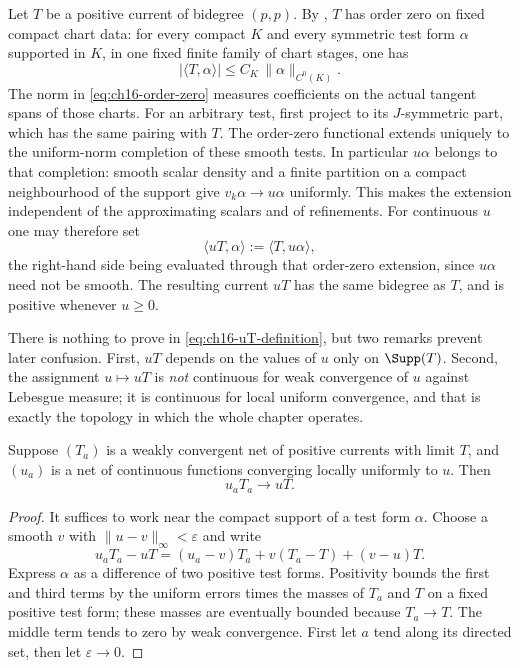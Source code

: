 Let $T$ be a positive current of bidegree $(p,p)$.  By
, $T$ has order zero on fixed compact
chart data: for every compact $K$ and every symmetric test form $\alpha$
supported in $K$, in one fixed finite family of chart stages, one has
\begin{equation}
\label{eq:ch16-order-zero}
 |\langle T,\alpha\rangle|
 \leq C_K\,\|\alpha\|_{C^0(K)} .
\end{equation}
The norm in \eqref{eq:ch16-order-zero} measures coefficients on the
actual tangent spans of those charts.  For an arbitrary test, first project
to its $J$-symmetric part, which has the same pairing with $T$.  The
order-zero functional extends uniquely to the uniform-norm completion of
these smooth tests.  In particular $u\alpha$ belongs to that completion:
smooth scalar density and a finite partition on a compact neighbourhood of
the support give $v_k\alpha\to u\alpha$ uniformly.  This makes the
extension independent of the approximating scalars and of refinements.  For continuous $u$ one may therefore set
\begin{equation}
\label{eq:ch16-uT-definition}
 \langle uT,\alpha\rangle:=\langle T,u\alpha\rangle ,
\end{equation}
the right-hand side being evaluated through that order-zero extension, since
$u\alpha$ need not be smooth.  The resulting current $uT$ has the same
bidegree as $T$, and is positive whenever $u\geq0$.

There is nothing to prove in \eqref{eq:ch16-uT-definition}, but two remarks
prevent later confusion.  First, $uT$ depends on the values of $u$ only on
$\Supp(T)$.  Second, the assignment $u\mapsto uT$ is \emph{not} continuous
for weak convergence of $u$ against Lebesgue measure; it is continuous for
local uniform convergence, and that is exactly the topology in which the
whole chapter operates.

\begin{lemma}
\label{lem:continuous-times-positive-current}
Suppose $(T_a)$ is a weakly convergent net of positive currents with limit
$T$, and $(u_a)$ is a net of continuous functions converging locally
uniformly to $u$.  Then
\[
                              u_aT_a\longrightarrow uT.
\]
\end{lemma}
\begin{proof}
It suffices to work near the compact support of a test form $\alpha$.  Choose
a smooth $v$ with $\|u-v\|_\infty<\varepsilon$ and write
\[
 u_aT_a-uT=(u_a-v)T_a+v(T_a-T)+(v-u)T.
\]
Express $\alpha$ as a difference of two positive test forms.  Positivity
bounds the first and third terms by the uniform errors times the masses of
$T_a$ and $T$ on a fixed positive test form; these masses are eventually
bounded because $T_a\to T$.  The middle term tends to zero by weak
convergence.  First let $a$ tend along its directed set, then let
$\varepsilon\to0$.
\end{proof}

